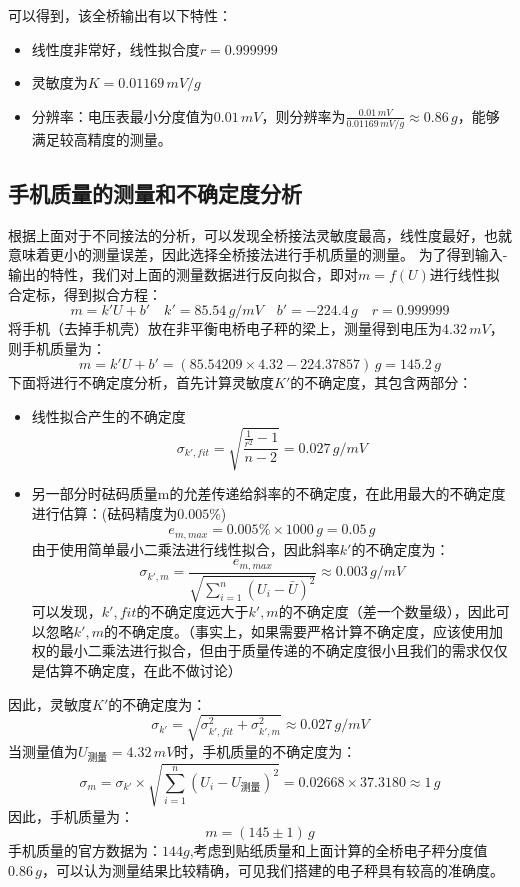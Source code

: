 \documentclass[12pt]{article}
\begin{document}
可以得到，该全桥输出有以下特性：
\begin{itemize}
  \item 线性度非常好，线性拟合度$r=0.999999$
  \item 灵敏度为$K=0.01169\,mV/g$
  \item 分辨率：电压表最小分度值为$0.01\,mV$，则分辨率为$\frac{0.01\,mV}{0.01169\,mV/g}\approx 0.86\,g$，能够满足较高精度的测量。
\end{itemize}

\subsection{手机质量的测量和不确定度分析}
\quad 根据上面对于不同接法的分析，可以发现全桥接法灵敏度最高，线性度最好，也就意味着更小的测量误差，因此选择全桥接法进行手机质量的测量。
为了得到输入-输出的特性，我们对上面的测量数据进行反向拟合，即对$m=f(U)$进行线性拟合定标，得到拟合方程：
\[
  m=k'U+b'\quad k'=85.54\,g/mV \quad b'=-224.4\,g \quad r=0.999999
\]
\quad 将手机（去掉手机壳）放在非平衡电桥电子秤的梁上，测量得到电压为$4.32\,mV$，则手机质量为：
\[
  m=k'U+b'=(85.54209\times4.32-224.37857)\,g=145.2\,g
\]
\quad 下面将进行不确定度分析，首先计算灵敏度$K'$的不确定度，其包含两部分：
\begin{itemize}
  \item 线性拟合产生的不确定度
  \[
    \sigma_{k',fit}=\sqrt{\frac{\frac{1}{r^2}-1}{n-2}}=0.027\,g/mV
  \]
  \item 另一部分时砝码质量m的允差传递给斜率的不确定度，在此用最大的不确定度进行估算：(砝码精度为$0.005\%$)
  \[
    e_{m,max}=0.005\%\times1000\,g=0.05\,g
  \]
  由于使用简单最小二乘法进行线性拟合，因此斜率$k'$的不确定度为：
  \[
    \sigma_{k',m}=\frac{e_{m,max}}{\sqrt{\sum_{i=1}^{n}(U_i-\bar{U})^2}}\approx 0.003\,g/mV
  \]
  可以发现，$k',fit$的不确定度远大于$k',m$的不确定度（差一个数量级），因此可以忽略$k',m$的不确定度。（事实上，如果需要严格计算不确定度，应该使用加权的最小二乘法进行拟合，但由于质量传递的不确定度很小且我们的需求仅仅是估算不确定度，在此不做讨论）
\end{itemize}
\quad 因此，灵敏度$K'$的不确定度为：
\[
  \sigma_{k'}=\sqrt{\sigma_{k',fit}^2+\sigma_{k',m}^2}\approx 0.027\,g/mV
\]
\quad 当测量值为$U_{测量}=4.32\,mV$时，手机质量的不确定度为：
\[
  \sigma_m=\sigma_{k'}\times \sqrt{\sum_{i=1}^{n}(U_i-{U_{\text{测量}}})^2}=0.02668\times 37.3180\approx 1\,g
\]
\quad 因此，手机质量为：
\[
  m=(145\pm1)\,g
\]
\quad 手机质量的官方数据为：$144g$,考虑到贴纸质量和上面计算的全桥电子秤分度值$0.86\,g$，可以认为测量结果比较精确，可见我们搭建的电子秤具有较高的准确度。
\end{document}
